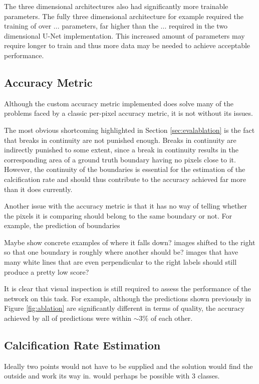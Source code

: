 The three dimensional architectures also had significantly more trainable parameters. The fully three dimensional architecture for example required the training of over ... parameters, far higher than the ... required in the two dimensional U-Net implementation. This increased amount of parameters may require longer to train and thus more data may be needed to achieve acceptable performance.

\subsection{Accuracy Metric}
\label{sec:evalaccuracy}

Although the custom accuracy metric implemented does solve many of the problems faced by a classic per-pixel accuracy metric, it is not without its issues.

The most obvious shortcoming highlighted in Section \ref{sec:evalablation} is the fact that breaks in continuity are not punished enough. Breaks in continuity are indirectly punished to some extent, since a break in continuity results in the corresponding area of a ground truth boundary having no pixels close to it. However, the continuity of the boundaries is essential for the estimation of the calcification rate and should thus contribute to the accuracy achieved far more than it does currently.

Another issue with the accuracy metric is that it has no way of telling whether the pixels it is comparing should belong to the same boundary or not. For example, the prediction of boundaries

Maybe show concrete examples of where it falls down? images shifted to the right so that one boundary is roughly where another should be? images that have many white lines that are even perpendicular to the right labels should still produce a pretty low score?

It is clear that visual inspection is still required to assess the performance of the network on this task. For example, although the predictions shown previously in Figure \ref{fig:ablation} are significantly different in terms of quality, the accuracy achieved by all of predictions were within ${\sim}3\%$ of each other.

\subsection{Calcification Rate Estimation}

Ideally two points would not have to be supplied and the solution would find the outside and work its way in. would perhaps be possible with 3 classes.

